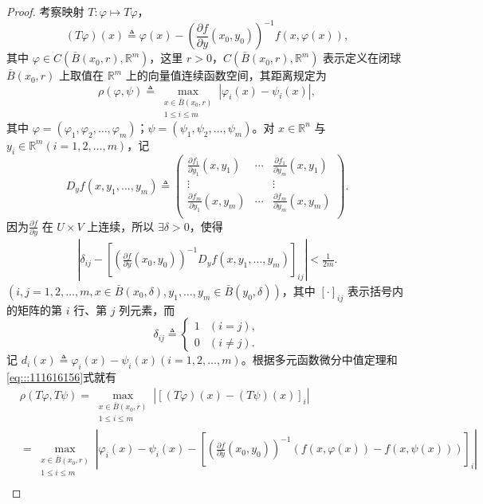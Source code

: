 \documentclass[../../main.tex]{subfiles}
\begin{document}
\begin{proof}
考察映射 \( T : \varphi \mapsto T\varphi \)，
\[
(T\varphi)(x) \triangleq \varphi(x) - \left( \frac{\partial f}{\partial y}(x_0, y_0) \right)^{-1} f(x, \varphi(x)),
\]
其中 \( \varphi \in C(\bar{B}(x_0, r), \mathbb{R}^m) \)，这里 \( r > 0 \)，\( C(\bar{B}(x_0, r), \mathbb{R}^m) \) 表示定义在闭球 \( \bar{B}(x_0, r) \) 上取值在 \( \mathbb{R}^m \) 上的向量值连续函数空间，其距离规定为
\[
\rho(\varphi, \psi) \triangleq \max_{\substack{x \in \bar{B}(x_0, r) \\ 1 \leqslant i \leqslant m}} |\varphi_i(x) - \psi_i(x)|,
\]
其中 \( \varphi = (\varphi_1, \varphi_2, \ldots, \varphi_m) \)；\( \psi = (\psi_1, \psi_2, \ldots, \psi_m) \)。对 \( x \in \mathbb{R}^n \) 与 \( y_i \in \mathbb{R}^m (i = 1, 2, \ldots, m) \)，记
\[
D_y f(x, y_1, \ldots, y_m) \triangleq \left( \begin{matrix}
\frac{\partial f_1}{\partial y_1}(x,y_1)&		\cdots&		\frac{\partial f_1}{\partial y_m}(x,y_1)\\
\vdots&		&		\vdots\\
\frac{\partial f_m}{\partial y_1}(x,y_m)&		\cdots&		\frac{\partial f_m}{\partial y_m}(x,y_m)\\
\end{matrix} \right) .
\]
因为\( \frac{\partial f}{\partial y} \) 在 \( U \times V \) 上连续，所以 \( \exists \delta > 0 \)，使得
\begin{align}
\left| \delta_{ij} - \left[ \left( \frac{\partial f}{\partial y}(x_0, y_0) \right)^{-1} D_y f(x, y_1, \ldots, y_m) \right]_{ij} \right| < \frac{1}{2m}.\label{eq:::111616156}
\end{align}
\( (i, j = 1, 2, \ldots, m, x \in \bar{B}(x_0, \delta), y_1, \ldots, y_m \in \bar{B}(y_0, \delta)) \)，其中 \( [\cdot]_{ij} \) 表示括号内的矩阵的第 \( i \) 行、第 \( j \) 列元素，而
\[
\delta_{ij} \triangleq \begin{cases} 
1 & (i = j), \\
0 & (i \neq j).
\end{cases}
\]
记 \( d_i(x) \triangleq \varphi_i(x) - \psi_i(x) (i = 1, 2, \ldots, m) \)。根据多元函数微分中值定理和\eqref{eq:::111616156}式就有
\begin{align}
&\rho(T\varphi, T\psi) = \max_{\substack{x \in \bar{B}(x_0, r) \\ 1 \leqslant i \leqslant m}} \left| \left[ (T\varphi)(x) - (T\psi)(x) \right]_i \right| \nonumber \\
&= \max_{\substack{x \in \bar{B}(x_0, r) \\ 1 \leqslant i \leqslant m}} \left| \varphi_i(x) - \psi_i(x) - \left[ \left( \frac{\partial f}{\partial y}(x_0, y_0) \right)^{-1} \left( f(x, \varphi(x)) - f(x, \psi(x)) \right) \right]_i \right| \nonumber \\

\end{align}
\end{proof}
\end{document}
